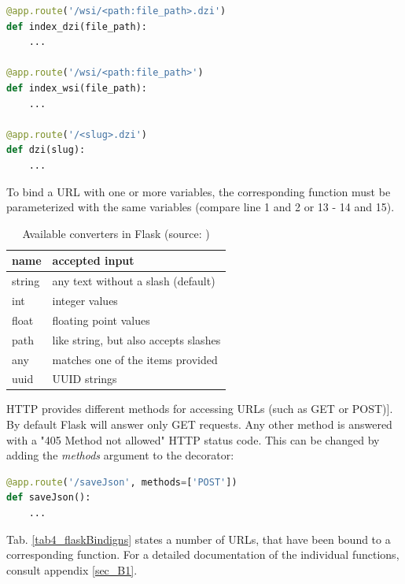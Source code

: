\begin{lstlisting}[language=Python, frame=single]
@app.route('/wsi/<path:file_path>.dzi')
def index_dzi(file_path):
	...

@app.route('/wsi/<path:file_path>')
def index_wsi(file_path):
	...

@app.route('/<slug>.dzi')
def dzi(slug):
	...
\end{lstlisting}

To bind a URL with one or more variables, the corresponding function must be parameterized with the same variables (compare line 1 and 2 or 13 - 14 and 15)\cite{web:flask}.

\begin{table}[H]
	\begin{center}
		\begin{tabular}{| l | l |}
			\hline
			\textbf{name} & \textbf{accepted input}\\ \hline
			string & any text without a slash (default)\\ \hline
			int & integer values\\ \hline
			float & floating point values\\ \hline
			path & like string, but also accepts slashes \\ \hline
			any & matches one of the items provided\\ \hline
			uuid & UUID strings\\ \hline
		\end{tabular}
		\caption{Available converters in Flask (source: \cite{web:flask})}
		\label{tab4_converter}
	\end{center}
\end{table}

HTTP provides different methods for accessing URLs (such as GET or POST)\cite{web:w3c}]. By default Flask will answer only GET requests. Any other method is answered with a "405 Method not allowed" HTTP status code\cite{web:flask}. This can be changed by adding the \emph{methods} argument to the decorator:

\begin{lstlisting}[language=Python, frame=single]
@app.route('/saveJson', methods=['POST'])
def saveJson():
	...
\end{lstlisting}

Tab. \ref{tab4_flaskBindigns} states a number of URLs, that have been bound to a corresponding function. For a detailed documentation of the individual functions, consult appendix \ref{sec_B1}.

